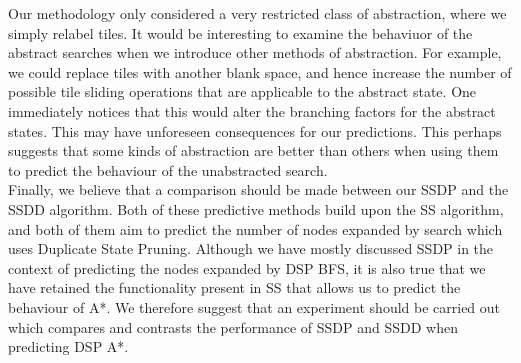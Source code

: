 \documentclass{article}
\begin{document}
Our methodology only considered a very restricted class of abstraction, where we simply relabel tiles. It would be interesting to examine the behaviuor of the abstract searches when we introduce other methods of abstraction. For example, we could replace tiles with another blank space, and hence increase the number of possible tile sliding operations that are applicable to the abstract state. One immediately notices that this would alter the branching factors for the abstract states. This may have unforeseen consequences for our predictions. This perhaps suggests that some kinds of abstraction are better than others when using them to predict the behaviour of the unabstracted search. \\

Finally, we believe that a comparison should be made between our SSDP and the SSDD algorithm. Both of these predictive methods build upon the SS algorithm, and both of them aim to predict the number of nodes expanded by search which uses Duplicate State Pruning. Although we have mostly discussed SSDP in the context of predicting the nodes expanded by DSP BFS, it is also true that we have retained the functionality present in SS that allows us to predict the behaviour of A*. We therefore suggest that an experiment should be carried out which compares and contrasts the performance of SSDP and SSDD when predicting DSP A*.

{}

\end{document}
